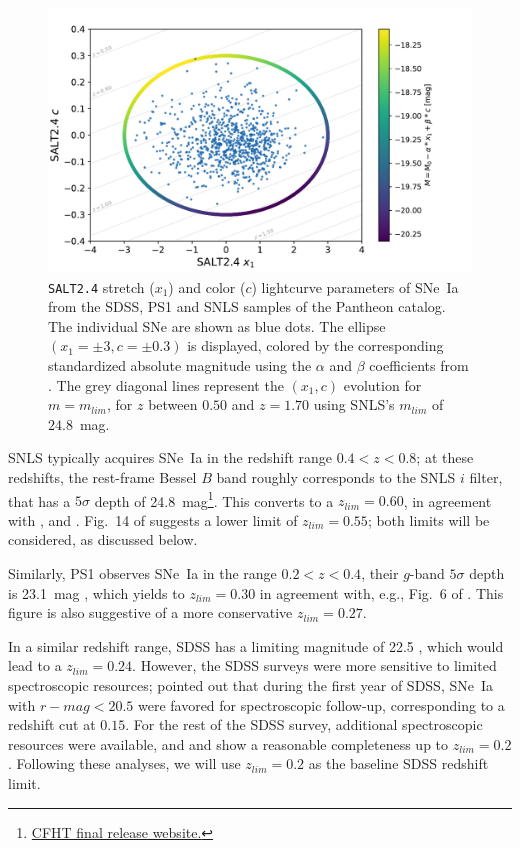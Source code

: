 \documentclass[]{aa} %
\newcommand{\mr}[1]{{\textcolor[rgb]{0.60,0.10,0.6}{#1}}}
\begin{document}
\begin{figure}
    \centering
    \includegraphics[width=0.95\linewidth]{Article_figures/zmax_maglim_snls.pdf}
    \caption{\textsc{\texttt{SALT2.4}} stretch ($x_1$) and color ($c$)
        lightcurve parameters of SNe~Ia from the SDSS, PS1 and SNLS samples of
        the Pantheon catalog. The individual SNe are shown as blue dots. The ellipse $(x_1=\pm3, c=\pm0.3)$ is displayed, colored by
the corresponding standardized absolute magnitude using the $\alpha$ and $\beta$
coefficients from \cite{scolnic2018a}. The grey diagonal lines represent the
$(x_1, c)$ evolution for $m = m_{lim}$, for $z$ between $0.50$ and $z=1.70$
using SNLS's $m_{lim}$ of $24.8$~mag.}
    \label{fig:maglim}
\end{figure}

SNLS typically acquires SNe~Ia in the redshift range $0.4<z<0.8$; at these
redshifts, the rest-frame Bessel $B$ band roughly corresponds to the SNLS $i$
filter, that has a $5\sigma$ depth of
24.8~mag\footnote{\href{https://www.cfht.hawaii.edu/Science/CFHTLS/cfhtlsfinalreleaseexecsummary.html}{CFHT
final release website.}}. This converts to a $z_{lim}=0.60$, in agreement with
\cite{neill2006}, \cite{perrett2010} and \cite{bazin2011}.  Fig.~14 of
\cite[][\mr{see their section~5}]{perrett2010} suggests a lower limit of $z_{lim}=0.55$; both limits will be
considered, as discussed below.

Similarly, PS1 observes SNe~Ia in the range $0.2<z<0.4$, their $g$-band
$5\sigma$ depth is 23.1~mag \citep{rest2014}, which yields to $z_{lim}=0.30$ in
agreement with, e.g., Fig.~6 of \cite{scolnic2018a}. This figure is also
suggestive of a more conservative $z_{lim}=0.27$.

In a similar redshift range, SDSS has a limiting magnitude of 22.5
\citep{dilday2008,sako2008}, which would lead to a $z_{lim}=0.24$. However, the
SDSS surveys were more sensitive to limited spectroscopic resources;
\cite[][\mr{see their section~2}]{kessler2009} pointed out that during the first year of SDSS, SNe~Ia with
$r-mag<20.5$ were favored for spectroscopic follow-up, corresponding to a
redshift cut at $0.15$. For the rest of the SDSS survey, additional
spectroscopic resources were available, and \cite{kessler2009} and
\cite{dilday2008} show a \mr{reasonable} completeness up to
$z_{lim}=0.2$. Following these analyses, we will use $z_{lim}=0.2$ as the
baseline SDSS redshift limit.
\end{document}
